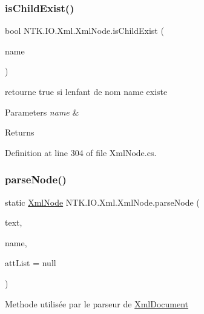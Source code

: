 \subsubsection{\texorpdfstring{isChildExist()}{isChildExist()}\hspace{0.1cm}{\footnotesize\ttfamily [2/2]}}
{\footnotesize\ttfamily bool N\+T\+K.\+I\+O.\+Xml.\+Xml\+Node.\+is\+Child\+Exist (\begin{DoxyParamCaption}\item[{String}]{name }\end{DoxyParamCaption})}



retourne true si l\textquotesingle{}enfant de nom name existe 


\begin{DoxyParams}{Parameters}
{\em name} & \\
\hline
\end{DoxyParams}
\begin{DoxyReturn}{Returns}

\end{DoxyReturn}


Definition at line 304 of file Xml\+Node.\+cs.

\mbox{\label{class_n_t_k_1_1_i_o_1_1_xml_1_1_xml_node_a67914d9a3b4c0e29ad165c8bcb551815}} 
\subsubsection{\texorpdfstring{parseNode()}{parseNode()}}
{\footnotesize\ttfamily static \mbox{\hyperlink{class_n_t_k_1_1_i_o_1_1_xml_1_1_xml_node}{Xml\+Node}} N\+T\+K.\+I\+O.\+Xml.\+Xml\+Node.\+parse\+Node (\begin{DoxyParamCaption}\item[{String}]{text,  }\item[{String}]{name,  }\item[{List$<$ \mbox{\hyperlink{class_n_t_k_1_1_i_o_1_1_xml_1_1_xml_attribute}{Xml\+Attribute}} $>$}]{att\+List = {\ttfamily null} }\end{DoxyParamCaption})\hspace{0.3cm}{\ttfamily [static]}}



Methode utilisée par le parseur de \mbox{\hyperlink{class_n_t_k_1_1_i_o_1_1_xml_1_1_xml_document}{Xml\+Document}} 



